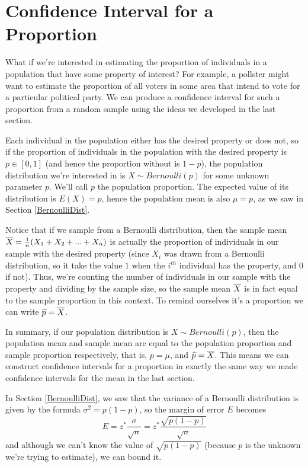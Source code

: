 \section{Confidence Interval for a Proportion}

What if we're interested in estimating the proportion of individuals in a population that have some property of interest? For example, a pollster might want to estimate the proportion of all voters in some area that intend to vote for a particular political party. We can produce a confidence interval for such a proportion from a random sample using the ideas we developed in the last section.
\par
Each individual in the population either has the desired property or does not, so if the proportion of individuals in the population with the desired property is $p \in [0,1]$ (and hence the proportion without is $1-p$), the population distribution we're interested in is $X \sim Bernoulli(p)$ for some unknown parameter $p$. We'll call $p$ the population proportion. The expected value of its distribution is $E(X) = p$, hence the population mean is also $\mu = p$, as we saw in Section \ref{BernoulliDist}.
\par
Notice that if we sample from a Bernoulli distribution, then the sample mean ${\overline{X}} = \frac{1}{n}(X_1+X_2+...+X_n)$ is actually the proportion of individuals in our sample with the desired property (since $X_i$ was drawn from a Bernoulli distribution, so it take the value $1$ when the $i^{th}$ individual has the property, and $0$ if not). Thus, we're counting the number of individuals in our sample with the property and dividing by the sample size, so the sample mean ${\overline{X}}$ is in fact equal to the sample proportion in this context. To remind ourselves it's a proportion we can write $\widehat{p} = {\overline{X}}$.
\par
In summary, if our population distribution is $X \sim Bernoulli(p)$, then the population mean and sample mean are equal to the population proportion and sample proportion respectively, that is, $p = \mu$, and $\widehat{p}={\overline{X}}$. This means we can construct confidence intervals for a proportion in exactly the same way we made confidence intervals for the mean in the last section.
\par
In Section \ref{BernoulliDist}, we saw that the variance of a Bernoulli distribution is given by the formula $\sigma^2 = p(1-p)$, so the margin of error $E$ becomes
$$E = z^*  \frac{\sigma}{\sqrt{n}} = z^*  \frac{\sqrt{p(1-p)}}{\sqrt{n}}$$
and although we can't know the value of $\sqrt{p(1-p)}$ (because $p$ is the unknown we're trying to estimate), we can bound it.
